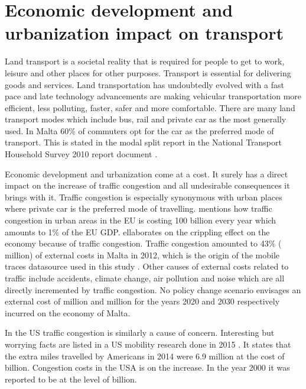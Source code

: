 \documentclass[12pt, a4paper]{report}
\theoremstyle{definition}
\theoremstyle{definition}%
\theoremstyle{definition}%
\theoremstyle{definition}%
\theoremstyle{definition}%
\theoremstyle{definition}%
\begin{document}
\section{Economic development and urbanization impact on transport} \label{section:introduction:economic_development}

Land transport is a societal reality that is required for people to get to work, leisure and other places for other purposes. Transport is essential for delivering goods and services. Land transportation has undoubtedly evolved with a fast pace and late technology advancements are making vehicular transportation more efficient, less polluting, faster, safer and more comfortable. There are many land transport modes which include bus, rail and private car as the most generally used. In Malta 60\% of commuters opt for the car as the preferred mode of transport. This is stated in the modal split report in the National Transport Household Survey 2010 report document  \cite{malta2011national}.

Economic development and urbanization come at a cost. It surely has a direct impact on the increase of traffic congestion and all undesirable consequences it brings with it. Traffic congestion is especially synonymous with urban places where private car is the preferred mode of travelling. \cite{EUTransportDirectorate2018} mentions how traffic congestion in urban areas in the EU is costing 100 billion every year which amounts to 1\% of the EU GDP. \cite{Colak2015} ellaborates on the crippling effect on the economy because of traffic congestion. Traffic congestion amounted to 43\% ( million) of external costs in Malta in 2012, which is the origin of the mobile traces datasource used in this study \cite{Attard2015}. Other causes of external costs related to traffic include accidents, climate change, air pollution and noise which are all directly incremented by traffic congestion. No policy change scenario envisages an external cost of  million and  million for the years 2020 and 2030 respectively incurred on the economy of Malta.

In the US traffic congestion is similarly a cause of concern. Interesting but worrying facts are listed in a US mobility research done in 2015 \cite{Schrank.2015}. It states that the extra miles travelled by Americans in 2014 were 6.9 million at the cost of  billion. Congestion costs in the USA is on the increase. In the year 2000 it was reported to be at the level of  billion.
\end{document}
